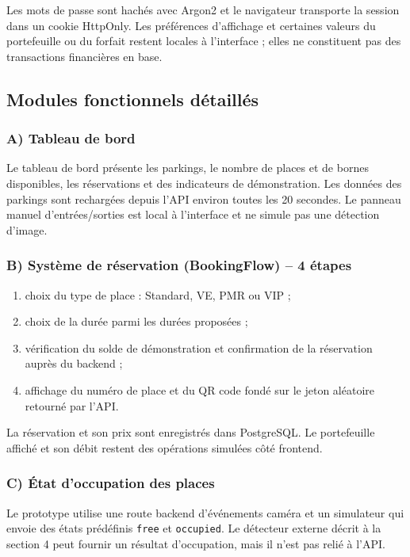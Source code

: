 \documentclass[12pt,a4paper]{report}
\begin{document}
Les mots de passe sont hachés avec Argon2 et le navigateur transporte la session dans un cookie HttpOnly. Les préférences d'affichage et certaines valeurs du portefeuille ou du forfait restent locales à l'interface ; elles ne constituent pas des transactions financières en base.

\subsection{Modules fonctionnels détaillés}

\subsubsection*{A) Tableau de bord}
Le tableau de bord présente les parkings, le nombre de places et de bornes disponibles, les réservations et des indicateurs de démonstration. Les données des parkings sont rechargées depuis l'API environ toutes les 20 secondes. Le panneau manuel d'entrées/sorties est local à l'interface et ne simule pas une détection d'image.

\subsubsection*{B) Système de réservation (BookingFlow) -- 4 étapes}
\begin{enumerate}
  \item choix du type de place : Standard, VE, PMR ou VIP ;
  \item choix de la durée parmi les durées proposées ;
  \item vérification du solde de démonstration et confirmation de la réservation auprès du backend ;
  \item affichage du numéro de place et du QR code fondé sur le jeton aléatoire retourné par l'API.
\end{enumerate}
La réservation et son prix sont enregistrés dans PostgreSQL. Le portefeuille affiché et son débit restent des opérations simulées côté frontend.

\subsubsection*{C) État d'occupation des places}
Le prototype utilise une route backend d'événements caméra et un simulateur qui envoie des états prédéfinis \texttt{free} et \texttt{occupied}. Le détecteur externe décrit à la section 4 peut fournir un résultat d'occupation, mais il n'est pas relié à l'API.
\end{document}
